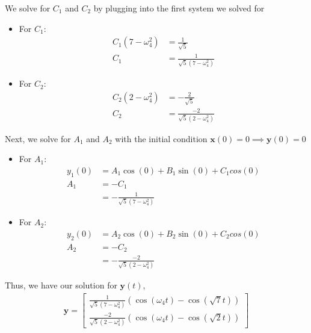 \documentclass[12pt]{article}
\begin{document}
We solve for $C_1$ and $C_2$ by plugging into the first system we solved for
\begin{itemize}
    \item For $C_1$:
          \begin{align*}
              C_1(7-\omega_4^2) & = \frac{1}{\sqrt{5}}               \\
              C_1               & = \frac{1}{\sqrt{5}(7-\omega_4^2)}
          \end{align*}
    \item For $C_2$:
          \begin{align*}
              C_2(2-\omega_4^2) & = -\frac{2}{\sqrt{5}}               \\
              C_2               & = \frac{-2}{\sqrt{5}(2-\omega_4^2)}
          \end{align*}
\end{itemize}

Next, we solve for $A_1$ and $A_2$ with the initial condition $\mathbf{x}(0) = 0 \implies{} \mathbf{y}(0) = 0$
\begin{itemize}
    \item For $A_1$:
          \begin{align*}
              y_1(0) & = A_1\cos(0) + B_1\sin(0) + C_1cos(0) \\
              A_1    & = -C_1                                \\
                     & = -\frac{1}{\sqrt{5}(7-\omega_4^2)}
          \end{align*}
    \item For $A_2$:
          \begin{align*}
              y_2(0) & = A_2\cos(0) + B_2\sin(0) + C_2cos(0) \\
              A_2    & = -C_2                                \\
                     & = -\frac{-2}{\sqrt{5}(2-\omega_4^2)}
          \end{align*}
\end{itemize}

Thus, we have our solution for $\mathbf{y}(t)$,
\begin{align*}
    \mathbf{y} = \begin{bmatrix}
                     \frac{1}{\sqrt{5}(7-\omega_4^2)}(\cos(\omega_{4}t) - \cos(\sqrt{7}t)) \\
                     \frac{-2}{\sqrt{5}(2-\omega_4^2)}(\cos(\omega_{4}t) - \cos(\sqrt{2}t))
                 \end{bmatrix}
\end{align*}
\end{document}
